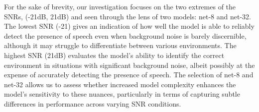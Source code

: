 \documentclass[logo,bsc,singlespacing,parskip,online]{infthesis}
\begin{document}
For the sake of brevity, our investigation focuses on the two extremes of the SNRs,
(-21dB, 21dB) and seen through the lens of two models: net-8 and net-32.
The lowest SNR (-21) gives an indication of
how well the model is able to reliably detect the presence of speech 
even when background noise is barely discernible, although it 
may struggle to differentiate between various environments.
The highest SNR (21dB) evaluates the model's
ability to identify the correct environment in situations with significant background noise, albeit possibly at the expense of accurately detecting the presence of speech.
The selection of net-8 and net-32 allows us to assess whether increased model complexity enhances the model's sensitivity to these nuances, particularly in terms of capturing subtle differences in performance across varying SNR conditions.
\end{document}
